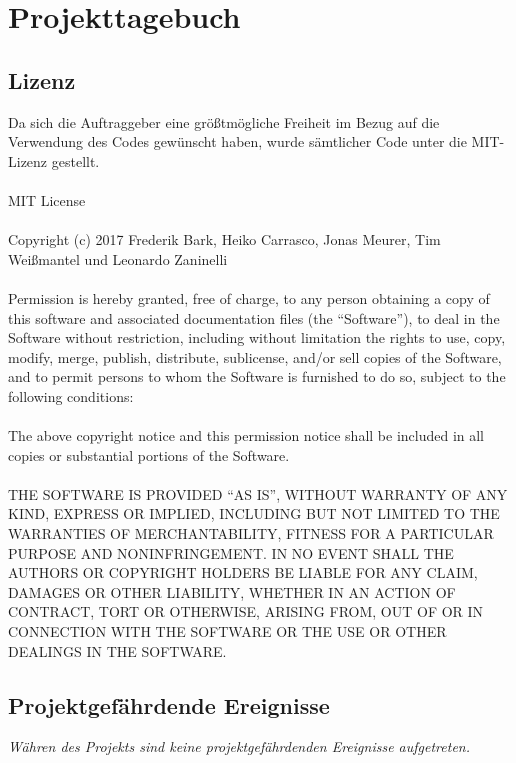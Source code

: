 \section{Projekttagebuch}
\subsection{Lizenz}
	Da sich die Auftraggeber eine größtmögliche Freiheit im Bezug
	auf die Verwendung des Codes gewünscht haben,
	wurde sämtlicher Code unter die MIT-Lizenz gestellt.
	\vspace{4em}
	\\\\
	MIT License
	\\\\
	Copyright (c) 2017 Frederik Bark, Heiko Carrasco, Jonas Meurer, Tim Weißmantel und Leonardo Zaninelli
	\\\\
	Permission is hereby granted, free of charge, to any person obtaining a copy of this software and associated documentation files (the ``Software''), to deal in the Software without restriction, including without limitation the rights to use, copy, modify, merge, publish, distribute, sublicense, and/or sell copies of the Software, and to permit persons to whom the Software is furnished to do so, subject to the following conditions:
	\\\\
	The above copyright notice and this permission notice shall be included in all copies or substantial portions of the Software.
	\\\\
	THE SOFTWARE IS PROVIDED ``AS IS'', WITHOUT WARRANTY OF ANY KIND, EXPRESS OR IMPLIED, INCLUDING BUT NOT LIMITED TO THE WARRANTIES OF MERCHANTABILITY, FITNESS FOR A PARTICULAR PURPOSE AND NONINFRINGEMENT. IN NO EVENT SHALL THE AUTHORS OR COPYRIGHT HOLDERS BE LIABLE FOR ANY CLAIM, DAMAGES OR OTHER LIABILITY, WHETHER IN AN ACTION OF CONTRACT, TORT OR OTHERWISE, ARISING FROM, OUT OF OR IN CONNECTION WITH THE SOFTWARE OR THE USE OR OTHER DEALINGS IN THE SOFTWARE.

	
\subsection{Projektgefährdende Ereignisse}
\textit{Währen des Projekts sind keine projektgefährdenden Ereignisse aufgetreten.}
